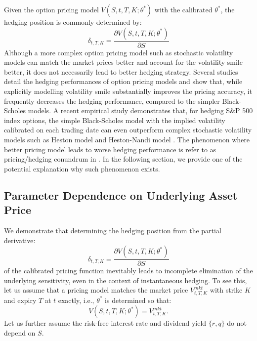 \documentclass[letterpaper,12pt,titlepage,oneside,final]{book}
\numberwithin{equation}{section}
\theoremstyle{definition}
\newcommand{\Vmkt}{V^{mkt}}
\begin{document}
Given the option pricing model $V(S,t,T,K;\theta^*)$ with the calibrated $\theta^*$, the hedging position is commonly determined by:
\[
\delta_{t,T,K}=  \frac{\partial V(S,t,T,K;\theta^*)}{\partial S}
\]
Although a more complex option pricing model such as stochastic volatility models can match the market prices better and account for the volatility smile better, it does not necessarily lead to better hedging strategy. 
Several studies \cite{dumas1998implied,bakshi1997empirical,yung2003empirical, lassance2018comparison} detail the hedging performances of option pricing models and show that, while explicitly
modelling volatility smile substantially improves the pricing
accuracy, it frequently decreases the hedging
performance, compared to the simpler  Black-Scholes models. A recent empirical study \cite{lassance2018comparison} demonstrates that, for hedging S\&P 500 index options, the simple Black-Scholes model with the implied volatility calibrated on each trading date can even outperform complex stochastic volatility models such as Heston model \cite{heston1993closed} and Heston-Nandi model \cite{heston2000closed}. The phenomenon where better pricing model leads to worse hedging performance is refer to as pricing/hedging conundrum in \cite{lassance2018comparison}. In the following section, we provide one of the potential explanation why such phenomenon exists.

\subsection{Parameter Dependence on Underlying Asset Price}
\label{sec：dependence}
We demonstrate that determining the hedging position from the partial derivative:
\[
\delta_{t,T,K}=  \frac{\partial V(S,t,T,K;\theta^*)}{\partial S}
\] of the calibrated pricing function inevitably leads to incomplete elimination of the underlying sensitivity, even in the context of instantaneous hedging. 
To see this,
let us assume that a pricing model matches the market price $\Vmkt_{t,T,K}$ with strike $K$ and expiry $T$  at $t$ exactly, i.e., $\theta^*$ is determined so that:
\begin{equation} 
     V(S,t,T,K;\theta^*)=\Vmkt_{t,T,K}.
	 \label{eq:imp2}
\end{equation} 
Let us further assume the risk-free interest rate and dividend yield $\{r,q\}$ do not depend on $S$. 
\end{document}

